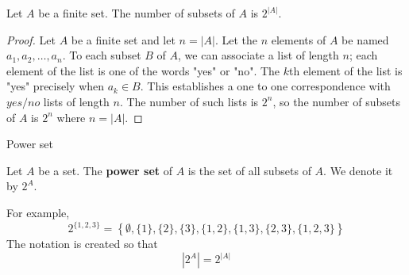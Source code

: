 \documentclass{beamer}
\begin{document}
\begin{frame}
\begin{theorem}
Let $A$ be a finite set. The number of subsets of $A$ is $2^{|A|}$.
\end{theorem}\pause

\begin{proof}
Let $A$ be a finite set and let $n=|A|$. Let the $n$ elements of $A$ be named $a_1,a_2,\dots,a_n$. To each subset $B$ of $A$, we can associate a list of length $n$; each element of the list is one of the words "yes" or "no". The $k$th element of the list is "yes" precisely when $a_k\in B$. This establishes a one to one correspondence with $yes/no$ lists of length $n$. The number of such lists is $2^n$, so the number of subsets of $A$ is $2^n$ where $n=|A|$.
\end{proof}\pause
{}
\end{frame}

\begin{frame}{Power set}
\begin{definition}
Let $A$ be a set. The \textbf{power set} of $A$ is the set of all subsets of $A$. We denote it by $2^A$.
\end{definition}\pause
For example, 
\[
2^{\{1,2,3\}}=\left\{\emptyset,\{1\},\{2\},\{3\},\{1,2\},\{1,3\},\{2,3\},\{1,2,3\}\right\}
\]\pause
The notation is created so that
\[
|2^A|=2^{|A|}
\]
\end{frame}
\end{document}
